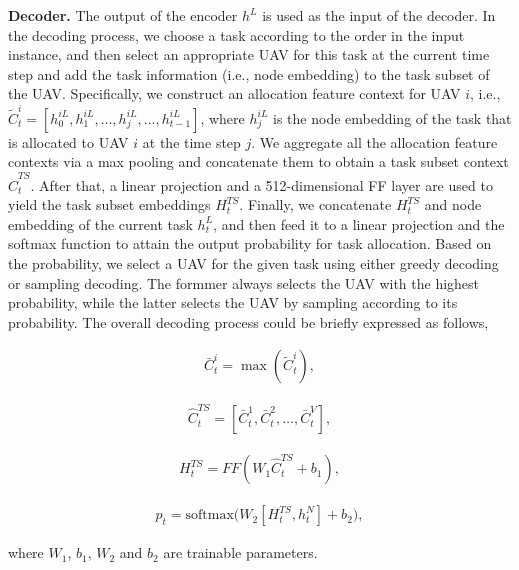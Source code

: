 \documentclass[lettersize,journal]{IEEEtran}
\begin{document}
	\textbf{Decoder.} The output of the encoder ${{h}^{L}}$ is used as the input of the decoder. In the decoding process, we choose a task according to the order in the input instance, and then select an appropriate UAV for this task at the current time step and add the task information (i.e., node embedding) to the task subset of the UAV. Specifically, we construct an allocation feature context for UAV $i$, i.e., $\tilde{C}_{t}^{i}=\left[ h_{0}^{iL},h_{1}^{iL},\ldots ,h_{j}^{iL},...,h_{t-1}^{iL} \right]$, where $h_{j}^{iL}$ is the node embedding of the task that is allocated to UAV $i$ at the time step $j$. We aggregate all the allocation feature contexts via a max pooling and concatenate them to obtain a task subset context $\hat{C}_{t}^{TS}$. After that, a linear projection and a 512-dimensional FF layer are used to yield the task subset embeddings $H_{t}^{TS}$. Finally, we concatenate $H_{t}^{TS}$ and node embedding of the current task $h_{t}^{L}$, and then feed it to a linear projection and the softmax function to attain the output probability for task allocation. Based on the probability, we select a UAV for the given task using either greedy decoding or sampling decoding. The formmer always selects the UAV with the highest probability, while the latter selects the UAV by sampling according to its probability. The overall decoding process could be briefly expressed as follows,
	
	\begin{small}
		\begin{equation}\label{decoder1}
			\begin{array}{cc}
				\bar{C}_{t}^{i}=\max \left( \tilde{C}_{t}^{i} \right),
			\end{array}
		\end{equation}
		
		\begin{equation}\label{decoder2}
			\begin{array}{cc}
				\hat{C}_{t}^{TS}=\left[ \bar{C}_{t}^{1},\bar{C}_{t}^{2},\ldots ,\bar{C}_{t}^{V} \right],
			\end{array}
		\end{equation}
		
		\begin{equation}\label{decoder3}
			\begin{array}{cc}
				H_{t}^{TS}=FF({{W}_{1}}\hat{C}_{t}^{TS}+{{b}_{1}}),
			\end{array}
		\end{equation}
		
		\begin{equation}\label{decoder4}
			\begin{array}{cc}
				{{p}_{t}}=\text{softmax(}{{W}_{2}}\left[ H_{t}^{TS},h_{t}^{N} \right]+{{b}_{2}}\text{)},
			\end{array}
		\end{equation}
	\end{small}
	where ${{W}_{1}}$, ${{b}_{1}}$, ${{W}_{\text{2}}}$ and ${{b}_{\text{2}}}$ are trainable parameters.
	
\end{document}
